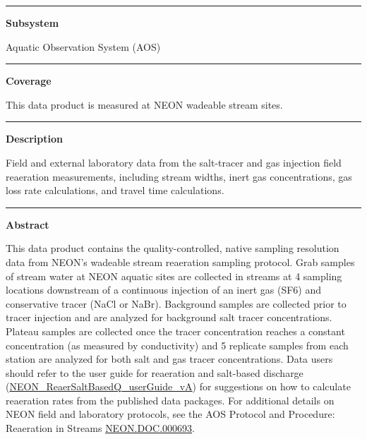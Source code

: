 \documentclass[]{article}
\begin{document}
\begin{center}\rule{0.5\linewidth}{\linethickness}\end{center}

\textbf{Subsystem}

Aquatic Observation System (AOS)

\begin{center}\rule{0.5\linewidth}{\linethickness}\end{center}

\textbf{Coverage}

This data product is measured at NEON wadeable stream sites.

\begin{center}\rule{0.5\linewidth}{\linethickness}\end{center}

\textbf{Description}

Field and external laboratory data from the salt-tracer and gas
injection field reaeration measurements, including stream widths, inert
gas concentrations, gas loss rate calculations, and travel time
calculations.

\begin{center}\rule{0.5\linewidth}{\linethickness}\end{center}

\textbf{Abstract}

This data product contains the quality-controlled, native sampling
resolution data from NEON's wadeable stream reaeration sampling
protocol. Grab samples of stream water at NEON aquatic sites are
collected in streams at 4 sampling locations downstream of a continuous
injection of an inert gas (SF6) and conservative tracer (NaCl or NaBr).
Background samples are collected prior to tracer injection and are
analyzed for background salt tracer concentrations. Plateau samples are
collected once the tracer concentration reaches a constant concentration
(as measured by conductivity) and 5 replicate samples from each station
are analyzed for both salt and gas tracer concentrations. Data users
should refer to the user guide for reaeration and salt-based discharge
(\href{http://data.neonscience.org/api/v0/documents/NEON_ReaerSaltBasedQ_userGuide_vA}{NEON\_ReaerSaltBasedQ\_userGuide\_vA})
for suggestions on how to calculate reaeration rates from the published
data packages. For additional details on NEON field and laboratory
protocols, see the AOS Protocol and Procedure: Reaeration in Streams
\href{http://data.neonscience.org/api/v0/documents/NEON.DOC.000693vH}{NEON.DOC.000693}.
\end{document}
